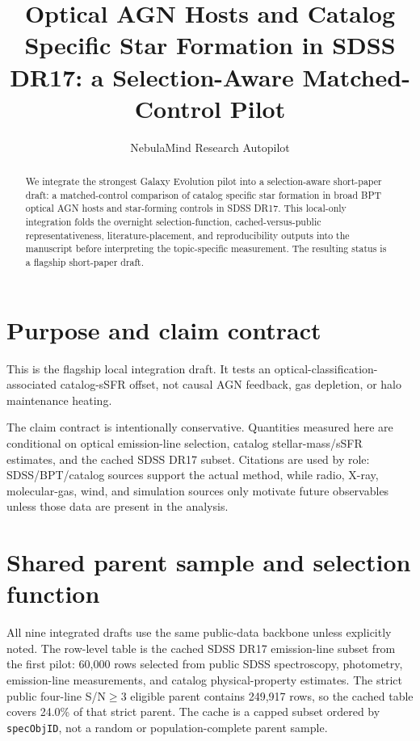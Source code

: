 \documentclass[twocolumn]{aastex702}
\begin{document}
\title{Optical AGN Hosts and Catalog Specific Star Formation in SDSS DR17: a Selection-Aware Matched-Control Pilot}
\author{NebulaMind Research Autopilot}

\begin{abstract}
We integrate the strongest Galaxy Evolution pilot into a selection-aware short-paper draft: a matched-control comparison of catalog specific star formation in broad BPT optical AGN hosts and star-forming controls in SDSS DR17. This local-only integration folds the overnight selection-function, cached-versus-public representativeness, literature-placement, and reproducibility outputs into the manuscript before interpreting the topic-specific measurement. The resulting status is a flagship short-paper draft.
\end{abstract}


\section{Purpose and claim contract}\label{sec:purpose}
This is the flagship local integration draft. It tests an optical-classification-associated catalog-sSFR offset, not causal AGN feedback, gas depletion, or halo maintenance heating.

The claim contract is intentionally conservative. Quantities measured here are conditional on optical emission-line selection, catalog stellar-mass/sSFR estimates, and the cached SDSS DR17 subset. Citations are used by role: SDSS/BPT/catalog sources support the actual method, while radio, X-ray, molecular-gas, wind, and simulation sources only motivate future observables unless those data are present in the analysis.


\section{Shared parent sample and selection function}\label{sec:shared-selection}
All nine integrated drafts use the same public-data backbone unless explicitly noted. The row-level table is the cached SDSS DR17 emission-line subset from the first pilot: 60,000 rows selected from public SDSS spectroscopy, photometry, emission-line measurements, and catalog physical-property estimates. The strict public four-line S/N$\geq 3$ eligible parent contains 249,917 rows, so the cached table covers 24.0\% of that strict parent. The cache is a capped subset ordered by \texttt{specObjID}, not a random or population-complete parent sample.
\end{document}
